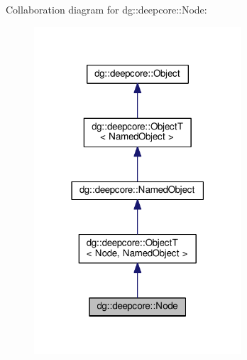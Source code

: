 Collaboration diagram for dg\+:\+:deepcore\+:\+:Node\+:
\nopagebreak
\begin{figure}[H]
\begin{center}
\leavevmode
\includegraphics[width=219pt]{classdg_1_1deepcore_1_1_node__coll__graph}
\end{center}
\end{figure}
